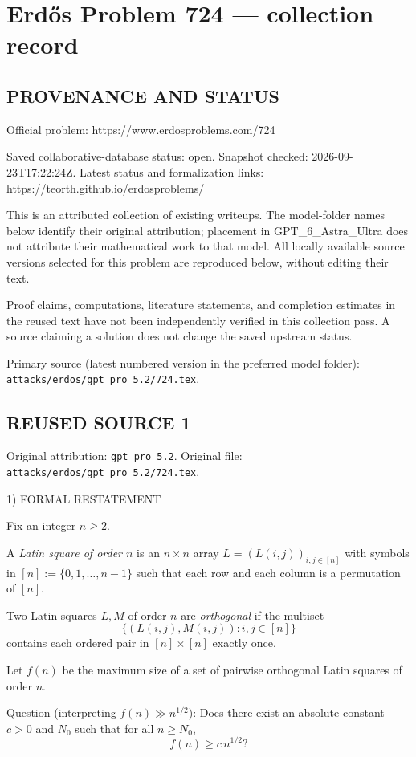 \section*{Erd\H{o}s Problem 724 --- collection record}

\subsection*{PROVENANCE AND STATUS}
Official problem: https://www.erdosproblems.com/724

Saved collaborative-database status: open.
Snapshot checked: 2026-09-23T17:22:24Z.
Latest status and formalization links: https://teorth.github.io/erdosproblems/

This is an attributed collection of existing writeups. The model-folder names below identify their original attribution; placement in GPT\_6\_Astra\_Ultra does not attribute their mathematical work to that model. All locally available source versions selected for this problem are reproduced below, without editing their text.

Proof claims, computations, literature statements, and completion estimates in the reused text have not been independently verified in this collection pass. A source claiming a solution does not change the saved upstream status.

Primary source (latest numbered version in the preferred model folder): \texttt{attacks/erdos/gpt\_pro\_5.2/724.tex}.

\subsection*{REUSED SOURCE 1}
Original attribution: \texttt{gpt\_pro\_5.2}.
Original file: \texttt{attacks/erdos/gpt\_pro\_5.2/724.tex}.


1) FORMAL RESTATEMENT

Fix an integer $n\ge 2$.

A \emph{Latin square of order $n$} is an $n\times n$ array $L=(L(i,j))_{i,j\in[n]}$ with symbols in $[n]:=\{0,1,\dots,n-1\}$ such that each row and each column is a permutation of $[n]$.

Two Latin squares $L,M$ of order $n$ are \emph{orthogonal} if the multiset
\[
\{(L(i,j),M(i,j)) : i,j\in[n]\}
\]
contains each ordered pair in $[n]\times[n]$ exactly once.

Let $f(n)$ be the maximum size of a set of pairwise orthogonal Latin squares of order $n$.

Question (interpreting $f(n)\gg n^{1/2}$): Does there exist an absolute constant $c>0$ and $N_0$ such that for all $n\ge N_0$,
\[
 f(n) \ge c\, n^{1/2}?
\]

